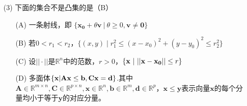 \documentclass[12pt,a4paper,openany,twoside]{ctexbook}
\begin{document}
\begin{exercise}
\begin{itemize}


		\item [(3)] 下面的集合不是凸集的是（B）
		\begin{itemize}
			\item [(A)] 一条射线，即 $\{\mathbf{x_0}+\theta\mathbf{v}\ |\  \theta \geq0 ,\mathbf{v} \not= \mathbf{0}\}$
			\item [(B)] 若$0<r_1 < r_2$，$\{(x, y) \mid r_1^2 \leq (x - x_0)^2 + (y - y_0)^2 \leq r_2^2\}$
			\item [(C)] 设$||·||$是$\mathbb{R}^{n}$中的范数，$r>0$，$\{\mathbf{x}\ | \space\ ||\mathbf{x}-\mathbf{x_0}||\leq r \}$
			\item [(D)] 多面体$\{ \mathbf{x}| \space \mathbf{Ax}\leq\mathbf{b}, \mathbf{Cx}=\mathbf{d}\}$.其中$\mathbf{A}\in\mathbb{R}^{m \times n}, \mathbf{C} \in\mathbb{R}^{p \times n},\mathbf{x}\in\mathbb{R}^{n},\mathbf{b}\in\mathbb{R}^{m},\mathbf{d}\in\mathbb{R}^{p}$，$\mathbf{x}\leq\mathbf{y}$表示向量$\mathbf{x}$的每个分量均小于等于$\mathbf{y}$的对应分量。
		\end{itemize}


\end{itemize}
\end{exercise}
\end{document}

